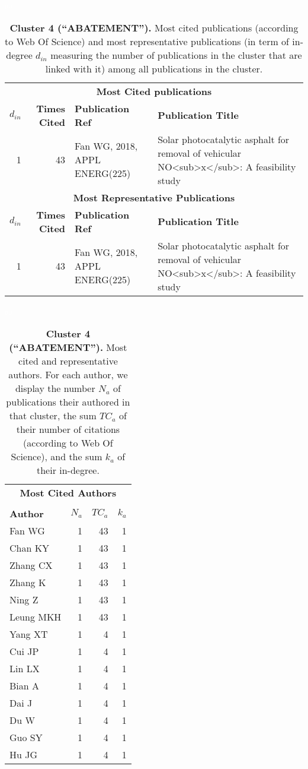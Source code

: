 \documentclass[a4paper,11pt]{report}
\begin{document}
\begin{landscape}
\clearpage

\begin{table}[!ht]
\caption*{{\bf Cluster 4 (``ABATEMENT'').} Most cited publications (according to Web Of Science) and most representative publications (in term of in-degree $d_{in}$ measuring the number of publications in the cluster that are linked with it) among all publications in the cluster.}
\textcolor{white}{aa}\\
{\scriptsize\begin{tabular}{|r r p{7cm} p{17cm}|}
\hline
\multicolumn{4}{|c|}{{\bf Most Cited publications}}\\
{\bf $d_{in}$} & {\bf Times Cited} & {\bf Publication Ref} & {\bf Publication Title} \\
1 & 43 & Fan WG, 2018, APPL ENERG(225) & Solar photocatalytic asphalt for removal of vehicular NO<sub>x</sub>: A feasibility study\\
\hline
\hline
\multicolumn{4}{|c|}{{\bf Most Representative Publications}}\\
{\bf $d_{in}$} & {\bf Times Cited} & {\bf Publication Ref} & {\bf Publication Title} \\
1 & 43 & Fan WG, 2018, APPL ENERG(225) & Solar photocatalytic asphalt for removal of vehicular NO<sub>x</sub>: A feasibility study\\
\hline
\end{tabular}
}
\end{table}

\clearpage

\begin{table}[!ht]
\caption*{{\bf Cluster 4 (``ABATEMENT'').} Most cited and representative authors. For each author, we display the number $N_a$ of publications their authored in that cluster, the sum $TC_a$ of their number of citations (according to Web Of Science), and the sum $k_a$ of their in-degree. }
\textcolor{white}{aa}\\
{\scriptsize\begin{tabular}{|l r r r|}
\hline
\multicolumn{4}{|c|}{{\bf Most Cited Authors}}\\
&&&\\
{\bf Author} & {\bf $N_a$} & {\bf $TC_a$} & {\bf $k_a$}\\
Fan WG & 1 & 43 & 1 \\
Chan KY & 1 & 43 & 1 \\
Zhang CX & 1 & 43 & 1 \\
Zhang K & 1 & 43 & 1 \\
Ning Z & 1 & 43 & 1 \\
Leung MKH & 1 & 43 & 1 \\
Yang XT & 1 & 4 & 1 \\
Cui JP & 1 & 4 & 1 \\
Lin LX & 1 & 4 & 1 \\
Bian A & 1 & 4 & 1 \\
Dai J & 1 & 4 & 1 \\
Du W & 1 & 4 & 1 \\
Guo SY & 1 & 4 & 1 \\
Hu JG & 1 & 4 & 1 \\
\hline


\end{tabular}}
\end{table}
\end{landscape}
\end{document}
